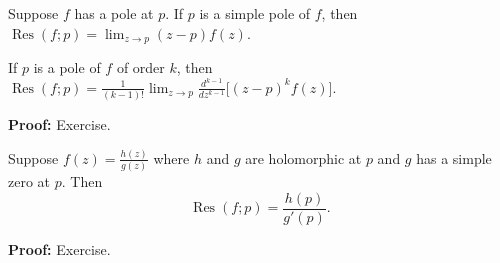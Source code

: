 \documentclass[10pt,aspectratio=169]{beamer}
\begin{document}
\begin{frame}


\begin{proposition}
Suppose $f$ has a pole at $p$.
If $p$ is a simple pole of $f$, then
\quad
$\displaystyle
\operatorname{Res}(f;p) = \lim_{z\to p} (z-p) f(z)$.

\pause
\medskip

If $p$ is a pole of $f$ of order $k$, then
\quad
$\displaystyle
\operatorname{Res}(f;p) = \frac{1}{(k-1)!} \lim_{z\to p}
\frac{d^{k-1}}{dz^{k-1}}\bigl[ (z-p)^{k} f(z) \bigr]$.
\end{proposition}

\pause

\textbf{Proof:} Exercise.

\pause

\begin{proposition}
Suppose $f(z) = \frac{h(z)}{g(z)}$ where $h$ and $g$ are holomorphic
at $p$ and $g$ has a simple zero at $p$. %
Then
\begin{equation*}
\operatorname{Res}(f;p) = \frac{h(p)}{g'(p)} .
\end{equation*}
\end{proposition}

\pause

\textbf{Proof:} Exercise.

\end{frame}
\end{document}
